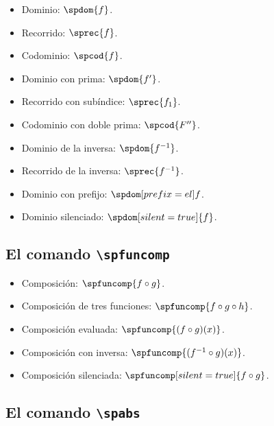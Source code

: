\documentclass{article}
\begin{document}
\begin{itemize}
  \item Dominio: $\spdom{f}$.
  \item Recorrido: $\sprec{f}$.
  \item Codominio: $\spcod{f}$.
  \item Dominio con prima: $\spdom{f'}$.
  \item Recorrido con subíndice: $\sprec{f_{1}}$.
  \item Codominio con doble prima: $\spcod{F''}$.
  \item Dominio de la inversa: $\spdom{f^{-1}}$.
  \item Recorrido de la inversa: $\sprec{f^{-1}}$.
  \item Dominio con prefijo: $\spdom[prefix={el}]{f}$.
  \item Dominio silenciado: $\spdom[silent=true]{f}$.
\end{itemize}

\subsection*{El comando \texttt{\textbackslash spfuncomp}}

\begin{itemize}
  \item Composición: $\spfuncomp{f\circ g}$.
  \item Composición de tres funciones: $\spfuncomp{f\circ g\circ h}$.
  \item Composición evaluada: $\spfuncomp{(f\circ g)(x)}$.
  \item Composición con inversa: $\spfuncomp{(f^{-1}\circ g)(x)}$.
  \item Composición silenciada: $\spfuncomp[silent=true]{f\circ g}$.
\end{itemize}

\subsection*{El comando \texttt{\textbackslash spabs}}
\end{document}
